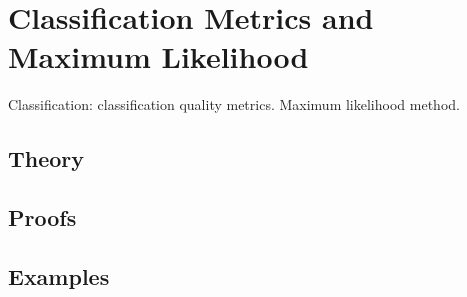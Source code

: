 
\section{Classification Metrics and Maximum Likelihood}
\label{sec:1.4.04-classification-mle}

\begin{ticket}
Classification: classification quality metrics. Maximum likelihood method.
\end{ticket}

\subsection*{Theory}

\subsection*{Proofs}

\subsection*{Examples}
